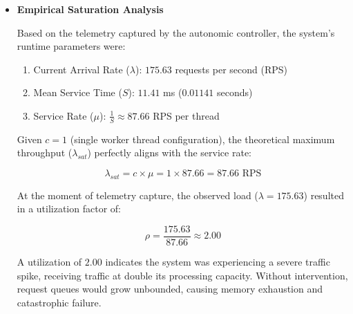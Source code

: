 \documentclass{article}
\begin{document}
\begin{itemize}
\textit{Result:} @picodico:~/pNum-gRPC/prime-ieee-pub\$ kubectl logs -l app=autonomic-controller
\begin{itemize}
    \item \textbf{Current RPS ($\lambda$):} 175.63
    \item \textbf{Service Time ($S_{cpr}$):} 11.41 ms
    \item \textbf{Crash Point ($\lambda_{sat}$):} 87.66 RPS
    \item \textbf{Trigger Point:} 70.13 RPS (Threshold: 80%
    \item \textbf{SATURATION THRESHOLD EXCEEDED!} Triggering sidecar injection...
    \item \textbf{Executing Mitigation:} Injecting Envoy Sidecar into prime-frontend...
    \item \textbf{Mitigation Initiated:} K8s is rolling out the Envoy sidecar.
    \item Waiting for deployment rollout to complete...
    \item Rollout Complete! Actuation Duration: 6.03 seconds.
    \item Mitigation complete. Idling container to allow metric extraction...
\end{itemize}

\item \textbf{Empirical Saturation Analysis}

Based on the telemetry captured by the autonomic controller, the system's runtime parameters were:
\begin{enumerate}
    \item Current Arrival Rate ($\lambda$): $175.63$ requests per second (RPS)
    \item Mean Service Time ($S$): $11.41$ ms ($0.01141$ seconds)
    \item Service Rate ($\mu$): $\frac{1}{S} \approx 87.66$ RPS per thread
\end{enumerate}

Given $c = 1$ (single worker thread configuration), the theoretical maximum throughput ($\lambda_{sat}$) perfectly aligns with the service rate:

$$\lambda_{sat} = c \times \mu = 1 \times 87.66 = 87.66 \text{ RPS}$$

At the moment of telemetry capture, the observed load ($\lambda = 175.63$) resulted in a utilization factor of:

$$\rho = \frac{175.63}{87.66} \approx 2.00$$

A utilization of $2.00$ indicates the system was experiencing a severe traffic spike, receiving traffic at double its processing capacity. Without intervention, request queues would grow unbounded, causing memory exhaustion and catastrophic failure.

\end{itemize}
\end{document}
